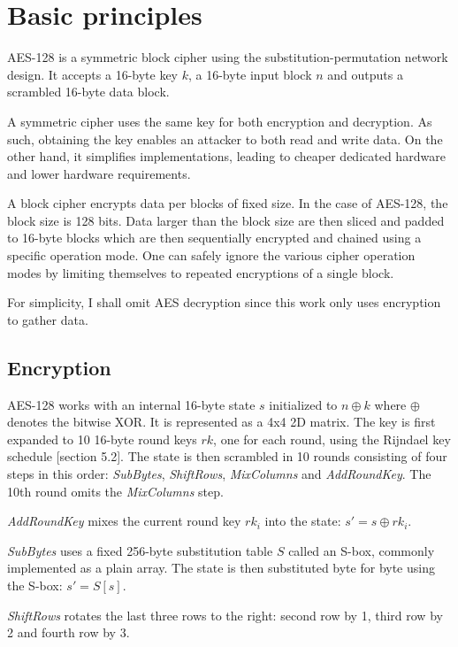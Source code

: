 \documentclass[thesis=B,english]{FITthesis}[2019/03/06]
\begin{document}
\section{Basic principles}
AES-128 is a symmetric block cipher using the substitution-permutation network design.
It accepts a 16-byte key $k$, a 16-byte input block $n$ and outputs a scrambled 16-byte data block.

A symmetric cipher uses the same key for both encryption and decryption. As such, obtaining the key enables an attacker to both read and write data.
On the other hand, it simplifies implementations, leading to cheaper dedicated hardware and lower hardware requirements.

A block cipher encrypts data per blocks of fixed size. In the case of AES-128, the block size is 128 bits. 
Data larger than the block size are then sliced and padded to 16-byte blocks which are then sequentially encrypted and chained using a specific operation mode.
One can safely ignore the various cipher operation modes by limiting themselves to repeated encryptions of a single block.

For simplicity, I shall omit AES decryption since this work only uses encryption to gather data.

\subsection{Encryption}
AES-128 works with an internal 16-byte state $s$ initialized to $n \oplus k$ where $\oplus$ denotes the bitwise XOR. It is represented as a 4x4 2D matrix.
The key is first expanded to 10 16-byte round keys $rk$, one for each round, using the Rijndael key schedule \cite{FIPS}[section 5.2].
The state is then scrambled in 10 rounds consisting of four steps in this order: \textit{SubBytes}, \textit{ShiftRows}, \textit{MixColumns} and \textit{AddRoundKey}.
The 10th round omits the \textit{MixColumns} step.
\pagebreak

\textit{AddRoundKey} mixes the current round key $rk_i$ into the state: $s' = s \oplus rk_i$.\vspace{0.1cm}

\textit{SubBytes} uses a fixed 256-byte substitution table $S$ called an S-box, commonly implemented as a plain array.
The state is then substituted byte for byte using the S-box: $s' = S[s]$.\vspace{0.1cm}

\textit{ShiftRows} rotates the last three rows to the right: second row by 1, third row by 2 and fourth row by 3.\vspace{0.1cm}
\end{document}
